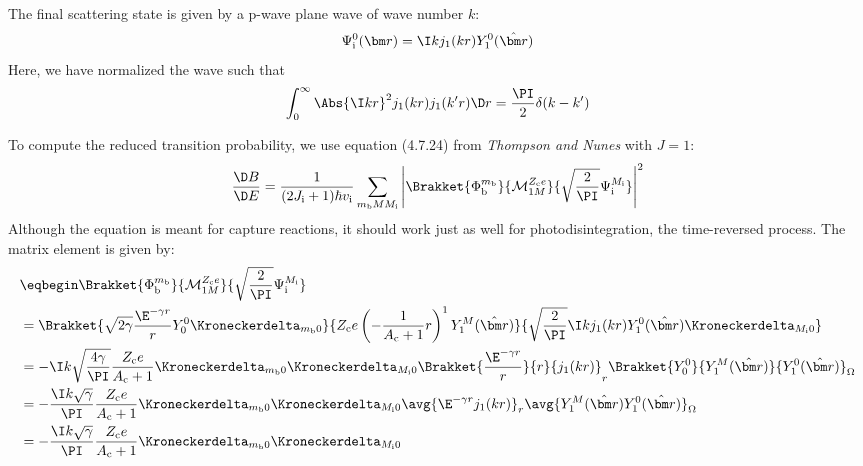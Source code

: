 \documentclass[fleqn, 12pt]{article}
\begin{document}
\begin{enumerate}
  The final scattering state is given by a p-wave plane wave of wave number
  $k$:
  \begin{align*}
    \Psi_{\text i}^0(\bm r) = \I k j_1(k r) Y_1^0(\hat{\bm r})
  \end{align*}
  Here, we have normalized the wave such that
  \begin{align*}
    \int_0^\infty \Abs{\I k r}^2 j_1(k r) j_1(k' r) \D r
    = \frac{\PI}{2} \delta(k - k')
  \end{align*}

  To compute the reduced transition probability, we use equation (4.7.24) from
  \textit{Thompson and Nunes} with $J = 1$:
  \begin{align*}
    \frac{\D B}{\D E} =
    \frac{1}{(2 J_{\text i} + 1) \hbar v_{\text i}}
    \sum_{m_{\text b} M M_{\text i}}
    \left|\Brakket{\Phi_{\text b}^{m_{\text b}}}{\mathcal M_{1 M}^{Z_{\text c} e}
    }{\sqrt{\frac{2}{\PI}} \Psi_{\text i}^{M_{\text i}}}\right|^2
  \end{align*}
  Although the equation is meant for capture reactions, it should work just as
  well for photodisintegration, the time-reversed process.  The matrix element
  is given by:
  \begin{align*}
    &\eqbegin \Brakket{\Phi_{\text b}^{m_{\text b}}}{\mathcal M_{1 M}^{Z_{\text c} e}
    }{\sqrt{\frac{2}{\PI}} \Psi_{\text i}^{M_{\text i}}} \\
    &= \Brakket{\sqrt{2 \gamma} \frac{\E^{-\gamma r}}{r} Y_0^0
      \Kroneckerdelta_{m_{\text b} 0}}{
      Z_{\text c} e \left(-\frac{1}{A_{\text c} + 1} r\right)^1 Y_1^M(\hat{\bm r})
      }{\sqrt{\frac{2}{\PI}} \I k j_1(k r) Y_1^0(\hat{\bm r})
      \Kroneckerdelta_{M_{\text i} 0}} \\
    &= -\I k \sqrt{\frac{4 \gamma}{\PI}}
      \frac{Z_{\text c} e}{A_{\text c} + 1}
      \Kroneckerdelta_{m_{\text b} 0} \Kroneckerdelta_{M_{\text i} 0}
      \Brakket{\frac{\E^{-\gamma r}}{r}}{r}{j_1(k r)}_r
      \Brakket{Y_0^0}{Y_1^M(\hat{\bm r})}{Y_1^0(\hat{\bm r})}_\Omega \\
    &= -\frac{\I k \sqrt{\gamma}}{\PI}
      \frac{Z_{\text c} e}{A_{\text c} + 1}
      \Kroneckerdelta_{m_{\text b} 0} \Kroneckerdelta_{M_{\text i} 0}
      \avg{\E^{-\gamma r} j_1(k r)}_r
      \avg{Y_1^M(\hat{\bm r}) Y_1^0(\hat{\bm r})}_\Omega \\
    &= -\frac{\I k \sqrt{\gamma}}{\PI}
      \frac{Z_{\text c} e}{A_{\text c} + 1}
      \Kroneckerdelta_{m_{\text b} 0} \Kroneckerdelta_{M_{\text i} 0}

\end{align*}
\end{enumerate}
\end{document}
